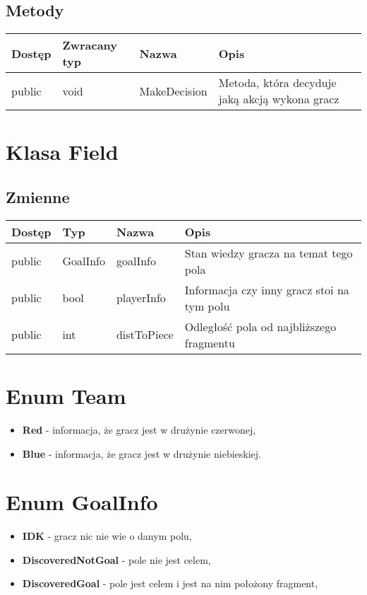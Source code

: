 \documentclass[11pt]{article}
\begin{document}
\subsection{Metody}
\begin{center}
\begin{tabular}{ | l | l | l | p{5cm} |}
    \hline
    Dostęp & Zwracany typ & Nazwa & Opis \\ \hline
    public & void & MakeDecision & Metoda, która decyduje jaką akcją wykona gracz \\ \hline
    \end{tabular}
\end{center}
\section{Klasa Field}
\subsection{Zmienne}
\begin{center}
    \begin{tabular}{ | l | l | l | p{5cm} |}
    \hline
    Dostęp & Typ & Nazwa & Opis \\ \hline
    public & GoalInfo & goalInfo & Stan wiedzy gracza na temat tego pola \\ \hline
    public & bool & playerInfo & Informacja czy inny gracz stoi na tym polu \\ \hline
    public & int & distToPiece & Odległość pola od najbliższego fragmentu \\ \hline
    \end{tabular}
\end{center}
\section{Enum Team}
\begin{itemize}
    \item \textbf{Red} - informacja, że gracz jest w drużynie czerwonej,
    \item \textbf{Blue} - informacja, że gracz jest w drużynie niebieskiej.
\end{itemize}
\section{Enum GoalInfo}
\begin{itemize}
    \item \textbf{IDK} - gracz nic nie wie o danym polu,
    \item \textbf{DiscoveredNotGoal} - pole nie jest celem,
    \item \textbf{DiscoveredGoal} - pole jest celem i jest na nim położony fragment,
\end{itemize}
\end{document}

